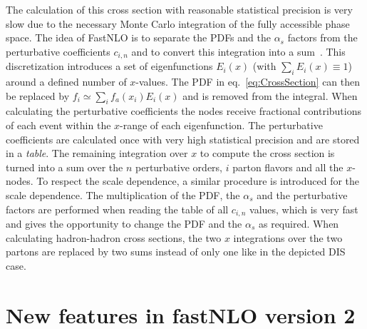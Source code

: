 \documentclass{DISproc}
\begin{document}
The calculation of this cross section with reasonable statistical
precision is very slow due to the necessary Monte Carlo integration of
the fully accessible phase space.  The idea of FastNLO is to separate
the PDFs and the $\alpha_s$ factors from the perturbative coefficients
$c_{i,n}$ and to convert this integration into a
sum~\cite{Pascaud:1994vx,Wobisch:00}.  This discretization introduces
a set of eigenfunctions $E_i(x)$ (with $\sum_iE_i(x) \equiv 1$) around
a defined number of $x$-values.  The PDF in eq.\ \ref{eq:CrossSection}
can then be replaced by $f_i \simeq \sum_i f_a(x_i) E_i(x)$ and is
removed from the integral.  When calculating the perturbative
coefficients the nodes receive fractional contributions of each event
within the $x$-range of each eigenfunction. The perturbative
coefficients are calculated once with very high statistical precision
and are stored in a \emph{table}.  The remaining integration over $x$
to compute the cross section is turned into a sum over the $n$
perturbative orders, $i$ parton flavors and all the $x$-nodes.  To
respect the scale dependence, a similar procedure is introduced for
the scale dependence.  The multiplication of the PDF, the $\alpha_s$
and the perturbative factors are performed when reading the table of
all $c_{i,n}$ values, which is very fast and gives the opportunity to
change the PDF and the $\alpha_s$ as required.  When calculating
hadron-hadron cross sections, the two $x$ integrations over the two
partons are replaced by two sums instead of only one like in the
depicted DIS case.



\section{New features in fastNLO version 2}
\end{document}

